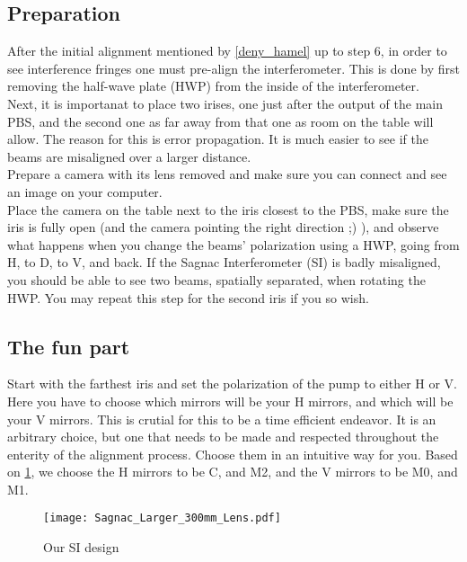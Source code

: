 \subsection{Preparation}
After the initial alignment mentioned by \ref{deny_hamel} up to step 6, in order to see interference fringes one must pre-align the interferometer. This is done by first removing the half-wave plate (HWP)
from the inside of the interferometer.\\
Next, it is importanat to place two irises, one just after the output of the main PBS, and the second one as far away from that one as room on the table will allow.
The reason for this is error propagation. It is much easier to see if the beams are misaligned over a larger distance.\\
Prepare a camera with its lens removed and make sure you can connect and see an image on your computer.\\
Place the camera on the table next to the iris closest to the PBS, make sure the iris is fully open (and the camera pointing the right direction ;) ),
and observe what happens when you change the beams' polarization using a HWP, going from H, to D, to V, and back. If the Sagnac Interferometer (SI) is badly misaligned,
you should be able to see two beams, spatially separated, when rotating the HWP. You may repeat this step for the second iris if you so wish.\\
\subsection{The fun part}
Start with the farthest iris and set the polarization of the pump to either H or V. Here you have to choose which mirrors will be your H mirrors, and which will be your V mirrors.
This is crutial for this to be a time efficient endeavor. It is an arbitrary choice, but one that needs to be made and respected throughout the enterity of the alignment process.
Choose them in an intuitive way for you. Based on \ref{fig:SI}, we choose the H mirrors to be C, and M2, and the V mirrors to be M0, and M1.

\begin{figure}[h!]
\begin{center}
	\texttt{[image: Sagnac\_Larger\_300mm\_Lens.pdf]}
\end{center}
\caption{Our SI design}
\label{fig:SI}
\end{figure}

